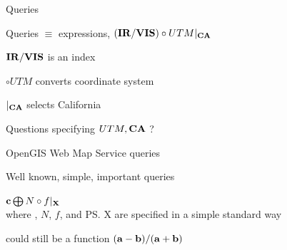 \documentclass[final,total,bgColor,slideColor,pdf,ps2pdf,default,noaccumulate]{prosper}
\begin{document}
\begin{slide}{Queries}

  Queries $\equiv$ expressions, $({\bf{IR}}/{\bf{VIS}}) \circ UTM |_{{\bf{CA}}}$
  \begin{Itemize}
  \item ${\bf{IR}}/{\bf{VIS}}$ is an index
  \item $\circ UTM$ converts coordinate system
  \item $|_{{\bf{CA}}}$ selects California
  \item Questions specifying $UTM, {\bf{CA}}$ ?
  \end{Itemize}
      
  OpenGIS Web Map Service queries
  \begin{Itemize}
  \item Well known, simple, important queries
  \item ${\bf{c}} \bigoplus N \circ f |_{\bf{X}}$ \\
    where , $N$, $f$, and \ps{X} are specified in a simple
    standard way
  \item {} could still be a function $({\bf{a}}-{\bf{b}})/({\bf{a}}+{\bf{b}})$
  \end{Itemize}
\end{slide}
\end{document}
